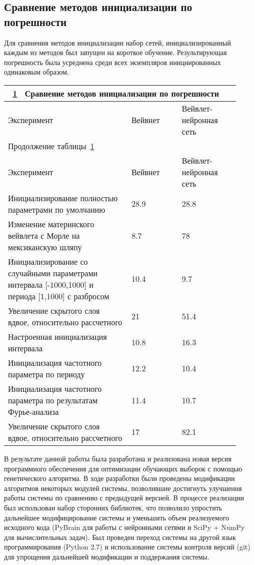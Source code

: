 \documentclass[utf8,usehyperref,14pt]{G7-32}
\begin{document}
\subsection{Сравнение методов инициализации по погрешности}
Для сравнения методов инициализации набор сетей, инициализированный каждым из методов был запущен на короткое обучение. Результирующая погрешность была усреднена среди всех экземпляров инициированных одинаковым образом.
\begin{longtable}{|p{0.49\linewidth}|p{0.2\linewidth}|p{0.23\linewidth}|}
\multicolumn{3}{l}{\tablename~\ref{Pogo} ~Сравнение методов инициализации по погрешности \label{Pogo}}\\
\hline
Эксперимент & Вейвнет & Вейвлет-нейронная сеть \\
\hline
\endfirsthead
\multicolumn{3}{l}{Продолжение таблицы~\ref{Pogo}}\\
\hline
Эксперимент & Вейвнет & Вейвлет-нейронная сеть   \\
\hline
\endhead
Инициализирование полностью параметрами по умолчанию & 28.9 & 28.8  \\ \hline
Изменение материнского вейвлета с Морле на мексиканскую шляпу & 8.7 & 78 \\ \hline
Инициализирование со случайными параметрами интервала [-1000,1000] и периода [1,1000] с разбросом & 10.4 & 9.7 \\ \hline
Увеличение скрытого слоя вдвое, относительно рассчетного & 21 & 51.4  \\ \hline
Настроенная инициализация интервала & 10.8 & 16.3  \\ \hline
Инициализация частотного параметра по периоду & 12.2 & 10.4  \\ \hline
Инициализация частотного параметра по результатам Фурье-анализа & 11.4 & 10.7  \\ \hline
Увеличение скрытого слоя вдвое, относительно рассчетного & 17 & 82.1  \\ \hline

\end{longtable}


\backmatter %

\Conclusion %

В результате данной работы была разработана и реализована новая версия программного обеспечения для оптимизации обучающих выборок с помощью генетического алгоритма. В ходе разработки были проведены модификации алгоритмов некоторых модулей системы, позволившие достигнуть улучшения работы системы по сравнению с предыдущей версией. В процессе реализации был использован набор сторонних библиотек, что позволило упростить дальнейшее модифицирование системы и уменьшить объем реализуемого исходного кода (PyBrain для работы с нейронными сетями и SciPy + NumPy для вычислительных задач). Был проведен переход системы на другой язык программирования (Python 2.7) и использование системы контроля версий (git) для упрощения дальнейшей модификации и поддержания системы.
\end{document}
